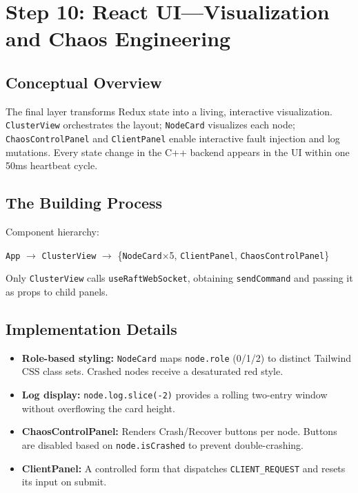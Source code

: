 \documentclass[11pt, a4paper]{article}
\begin{document}
\newpage

\section{Step 10: React UI---Visualization and Chaos Engineering}

\subsection{Conceptual Overview}
The final layer transforms Redux state into a living, interactive
visualization. \texttt{ClusterView} orchestrates the layout;
\texttt{NodeCard} visualizes each node; \texttt{ChaosControlPanel} and
\texttt{ClientPanel} enable interactive fault injection and log mutations.
Every state change in the C++ backend appears in the UI within one 50ms
heartbeat cycle.

\subsection{The Building Process}
Component hierarchy:
\begin{center}
\texttt{App} $\rightarrow$ \texttt{ClusterView} $\rightarrow$
\{\texttt{NodeCard}$\times$5, \texttt{ClientPanel}, \texttt{ChaosControlPanel}\}
\end{center}
Only \texttt{ClusterView} calls \texttt{useRaftWebSocket}, obtaining
\texttt{sendCommand} and passing it as props to child panels.

\subsection{Implementation Details}
\begin{itemize}[leftmargin=*]
    \item \textbf{Role-based styling:} \texttt{NodeCard} maps
          \texttt{node.role} (0/1/2) to distinct Tailwind CSS class sets.
          Crashed nodes receive a desaturated red style.
    \item \textbf{Log display:} \texttt{node.log.slice(-2)} provides a
          rolling two-entry window without overflowing the card height.
    \item \textbf{ChaosControlPanel:} Renders Crash/Recover buttons per node.
          Buttons are disabled based on \texttt{node.isCrashed} to prevent
          double-crashing.
    \item \textbf{ClientPanel:} A controlled form that dispatches
          \texttt{CLIENT\_REQUEST} and resets its input on submit.
\end{itemize}
\end{document}
